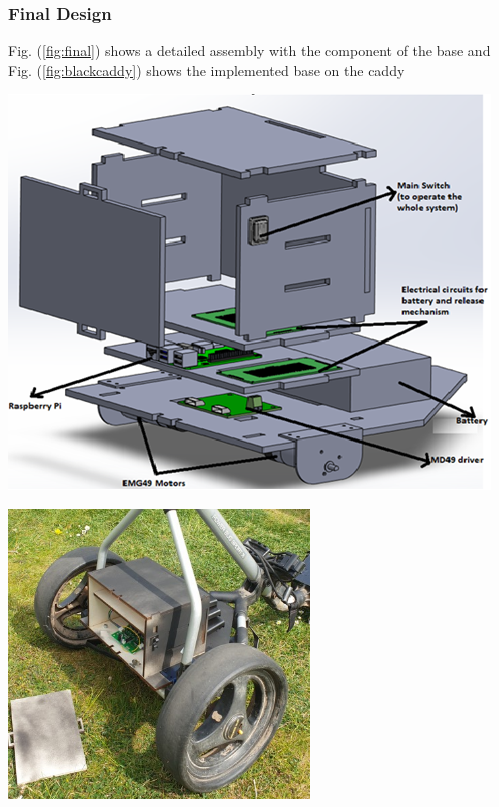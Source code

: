 \documentclass[11pt,landscape]{article}
\newenvironment{Figure}
  {\par\medskip\noindent\minipage{\linewidth}}
  {\endminipage\par\medskip}
\begin{document}
\begin{multicols}{2}
    
\subsubsection{Final Design}
Fig. (\ref{fig:final}) shows a detailed assembly with the component of the base
and Fig. (\ref{fig:blackcaddy}) shows the implemented base on the caddy

\begin{Figure}
    \begin{center}
        \includegraphics[width=\textwidth]{basefinal.png}
        \label{fig:final}
    \end{center}
\end{Figure}

\begin{Figure}
    \begin{center}
        \includegraphics[width=0.6\textwidth]{Figure37.jpg}
        \label{fig:blackcaddy}
    \end{center}
\end{Figure}
    

\end{multicols}
\end{document}
